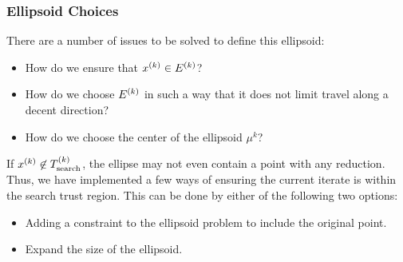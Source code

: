  








\subsubsection{Ellipsoid Choices}

There are a number of issues to be solved to define this ellipsoid:
\begin{itemize}
\item How do we ensure that ${x^{(k)}} \in {E^{(k)}} $?
\item How do we choose ${E^{(k)}}$ in such a way that it does not limit travel along a decent direction?
\item How do we choose the center of the ellipsoid $\mu^k$?
\end{itemize}


If ${x^{(k)}} \not \in {T_{\text{search}}^{(k)}} $, the ellipse may not even contain a point with any reduction.
Thus, we have implemented a few ways of ensuring the current iterate is within the search trust region.
This can be done by either of the following two options:
\begin{itemize}
\item Adding a constraint to the ellipsoid problem to include the original point.
\item Expand the size of the ellipsoid.
\end{itemize}

